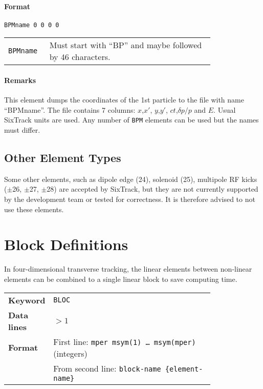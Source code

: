 \paragraph{Format} \texttt{BPMname 0 0 0 0}

\bigskip
\begin{tabular}{@{}lp{0.8\linewidth}}
    \texttt{BPMname} & Must start with ``BP'' and maybe followed by 46 characters.
\end{tabular}

\paragraph{Remarks}
This element dumps the coordinates of the 1st particle to the file with name ``BPMname''.
The file contains 7 columns: $x$,$x'$, $y$,$y'$, $ct$,$\delta p/p$ and $E$.
Usual SixTrack units are used.
Any number of \texttt{BPM} elements can be used but the names must differ. 

\subsection{Other Element Types}

Some other elements, such as dipole edge (24), solenoid (25), multipole RF kicks ($\pm$26, $\pm$27, $\pm$28) are accepted by SixTrack, but they are not currently supported by the development team or tested for correctness.
It is therefore advised to not use these elements.

\section{Block Definitions} \label{BloDef}

In four-dimensional transverse tracking, the linear elements between non-linear elements can be combined to a single linear block to save computing time.

\bigskip
\begin{tabular}{@{}lp{0.8\linewidth}}
    \textbf{Keyword}    & \texttt{BLOC} \\
    \textbf{Data lines} & $>1$ \\
    \textbf{Format}     & First line: \texttt{mper msym(1) \dots~msym(mper)} (integers) \\
                        & From second line: \texttt{block-name \{element-name\}}
\end{tabular}

